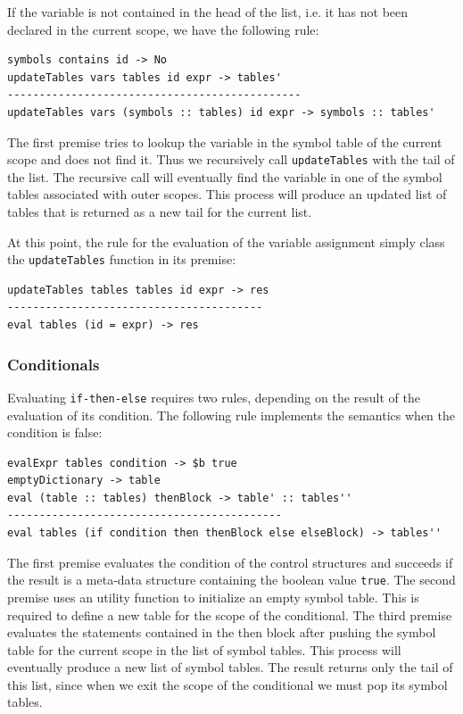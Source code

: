 If the variable is not contained in the head of the list, i.e. it has not been declared in the current scope, we have the following rule:

\begin{lstlisting}
symbols contains id -> No
updateTables vars tables id expr -> tables'
----------------------------------------------
updateTables vars (symbols :: tables) id expr -> symbols :: tables'
\end{lstlisting}

The first premise tries to lookup the variable in the symbol table of the current scope and does not find it. Thus we recursively call \texttt{updateTables} with the tail of the list. The recursive call will eventually find the variable in one of the symbol tables associated with outer scopes. This process will produce an updated list of tables that is returned as a new tail for the current list.

At this point, the rule for the evaluation of the variable assignment simply class the \texttt{updateTables} function in its premise:

\begin{lstlisting}
updateTables tables tables id expr -> res
----------------------------------------
eval tables (id = expr) -> res
\end{lstlisting}

\subsubsection{Conditionals}

Evaluating \texttt{if-then-else} requires two rules, depending on the result of the evaluation of its condition. The following rule implements the semantics when the condition is false:

\begin{lstlisting}
evalExpr tables condition -> $b true
emptyDictionary -> table
eval (table :: tables) thenBlock -> table' :: tables''
-------------------------------------------
eval tables (if condition then thenBlock else elseBlock) -> tables''
\end{lstlisting}

The first premise evaluates the condition of the control structures and succeeds if the result is a meta-data structure containing the boolean value \texttt{true}. The second premise uses an utility function to initialize an empty symbol table. This is required to define a new table for the scope of the conditional. The third premise evaluates the statements contained in the then block after pushing the symbol table for the current scope in the list of symbol tables. This process will eventually produce a new list of symbol tables. The result returns only the tail of this list, since when we exit the scope of the conditional we must pop its symbol tables.

